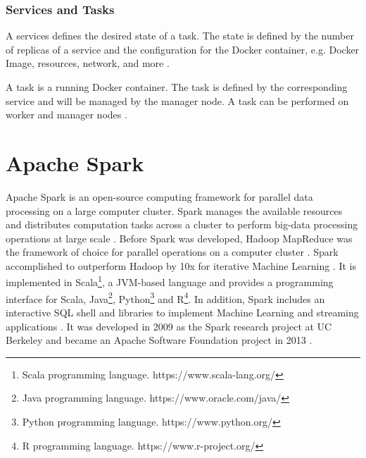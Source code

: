 \subsubsection{Services and Tasks}
A services defines the desired state of a task. The state is defined by the number of replicas of a service and the configuration for the Docker container, e.g. Docker Image, resources, network, and more \cite{Docker2020Docs}.


A task is a running Docker container. The task is defined by the corresponding service and will be managed by the manager node. A task can be performed on worker and manager nodes \cite{Docker2020Docs}.






\section{Apache Spark}
Apache Spark is an open-source computing framework for parallel data processing on a large computer cluster. Spark manages the available resources and distributes computation tasks across a cluster to perform big-data processing operations at large scale \cite{Chambers2018Spark}. Before Spark was developed, Hadoop MapReduce \cite{Dean2010MapReduce} was the framework of choice for parallel operations on a computer cluster \cite{Zaharia2010Spark}. Spark accomplished to outperform Hadoop by 10x for iterative Machine Learning \cite{Zaharia2010Spark}. It is implemented in Scala\footnote{Scala programming language. https://www.scala-lang.org/}, a JVM-based language and provides a programming interface for Scala, Java\footnote{Java programming language. https://www.oracle.com/java/}, Python\footnote{Python programming language. https://www.python.org/} and R\footnote{R programming language. https://www.r-project.org/}. In addition, Spark includes an interactive SQL shell and libraries to implement Machine Learning and streaming applications \cite{Chambers2018Spark}.
It was developed in 2009 as the Spark research project at UC Berkeley and became an Apache Software Foundation project in 2013 \cite{Chambers2018Spark}. 


